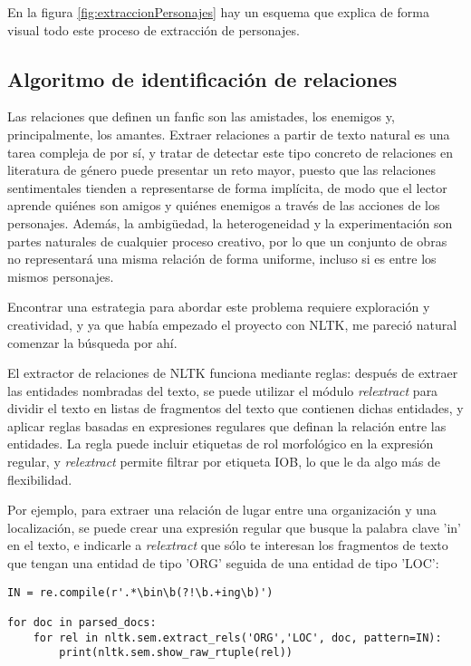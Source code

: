 \documentclass{pre-tfg}
\begin{document}
En la figura \ref{fig:extraccionPersonajes} hay un esquema que explica de forma visual todo este proceso de extracción de personajes.




\subsection{Algoritmo de identificación de relaciones}

Las relaciones que definen un fanfic son las amistades, los enemigos y, principalmente, los amantes. Extraer relaciones a partir de texto natural es una tarea compleja de por sí, y tratar de detectar este tipo concreto de relaciones en literatura de género puede presentar un reto mayor, puesto que las relaciones sentimentales tienden a representarse de forma implícita, de modo que el lector aprende quiénes son amigos y quiénes enemigos a través de las acciones de los personajes. Además, la ambigüedad, la heterogeneidad y la experimentación son partes naturales de cualquier proceso creativo, por lo que un conjunto de obras no representará una misma relación de forma uniforme, incluso si es entre los mismos personajes.

Encontrar una estrategia para abordar este problema requiere exploración y creatividad, y ya que había empezado el proyecto con NLTK, me pareció natural comenzar la búsqueda por ahí.

El extractor de relaciones de NLTK funciona mediante reglas: después de extraer las entidades nombradas del texto, se puede utilizar el módulo \textit{relextract} para dividir el texto en listas de fragmentos del texto que contienen dichas entidades, y aplicar reglas basadas en expresiones regulares que definan la relación entre las entidades. La regla puede incluir etiquetas de rol morfológico en la expresión regular, y \textit{relextract} permite filtrar por etiqueta IOB, lo que le da algo más de flexibilidad.

Por ejemplo, para extraer una relación de lugar entre una organización y una localización, se puede crear una expresión regular que busque la palabra clave 'in' en el texto, e indicarle a \textit{relextract} que sólo te interesan los fragmentos de texto que tengan una entidad de tipo 'ORG' seguida de una entidad de tipo 'LOC':
\begin{lstlisting}[style=consola, caption=Ejemplo de código que utiliza el módulo \textit{regexp} de NLTK para extraer relaciones de lugar y mostrarlas por pantalla. Adaptado del capítulo 7 de Natural Language Processing with Python\cite{bird_2012}]
IN = re.compile(r'.*\bin\b(?!\b.+ing\b)')

for doc in parsed_docs:
	for rel in nltk.sem.extract_rels('ORG','LOC', doc, pattern=IN):
		print(nltk.sem.show_raw_rtuple(rel))

\end{lstlisting}
\end{document}
